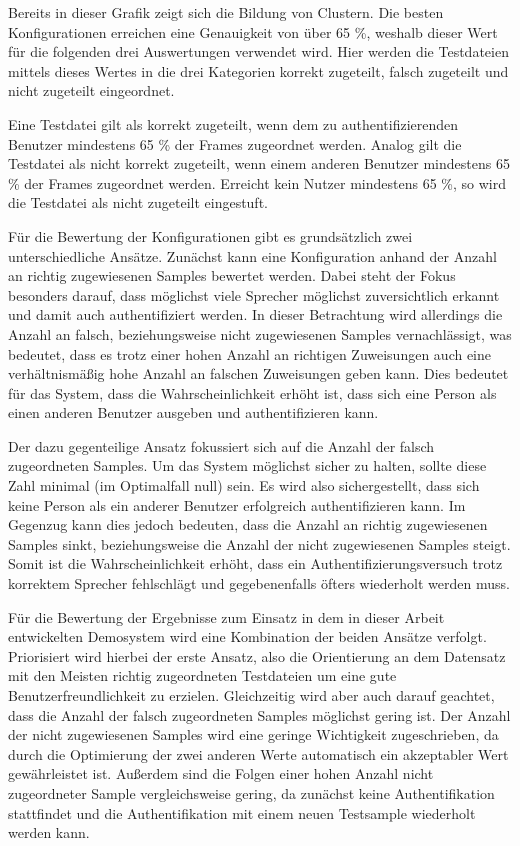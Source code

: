 Bereits in dieser Grafik zeigt sich die Bildung von Clustern.
Die besten Konfigurationen erreichen eine Genauigkeit von über 65 \%, weshalb dieser Wert für die folgenden drei Auswertungen verwendet wird.
Hier werden die Testdateien mittels dieses Wertes in die drei Kategorien korrekt zugeteilt, falsch zugeteilt und nicht zugeteilt eingeordnet.

Eine Testdatei gilt als korrekt zugeteilt, wenn dem zu authentifizierenden Benutzer mindestens 65 \% der Frames zugeordnet werden.
Analog gilt die Testdatei als nicht korrekt zugeteilt, wenn einem anderen Benutzer mindestens 65 \% der Frames zugeordnet werden.
Erreicht kein Nutzer mindestens 65 \%, so wird die Testdatei als nicht zugeteilt eingestuft.

Für die Bewertung der Konfigurationen gibt es grundsätzlich zwei unterschiedliche Ansätze.
Zunächst kann eine Konfiguration anhand der Anzahl an richtig zugewiesenen Samples bewertet werden.
Dabei steht der Fokus besonders darauf, dass möglichst viele Sprecher möglichst zuversichtlich erkannt und damit auch authentifiziert werden.
In dieser Betrachtung wird allerdings die Anzahl an falsch, beziehungsweise nicht zugewiesenen Samples vernachlässigt, was bedeutet, dass es trotz einer hohen Anzahl an richtigen Zuweisungen auch eine verhältnismäßig hohe Anzahl an falschen Zuweisungen geben kann.
Dies bedeutet für das System, dass die Wahrscheinlichkeit erhöht ist, dass sich eine Person als einen anderen Benutzer ausgeben und authentifizieren kann.

Der dazu gegenteilige Ansatz fokussiert sich auf die Anzahl der falsch zugeordneten Samples.
Um das System möglichst sicher zu halten, sollte diese Zahl minimal (im Optimalfall null) sein.
Es wird also sichergestellt, dass sich keine Person als ein anderer Benutzer erfolgreich authentifizieren kann.
Im Gegenzug kann dies jedoch bedeuten, dass die Anzahl an richtig zugewiesenen Samples sinkt, beziehungsweise die Anzahl der nicht zugewiesenen Samples steigt.
Somit ist die Wahrscheinlichkeit erhöht, dass ein Authentifizierungsversuch trotz korrektem Sprecher fehlschlägt und gegebenenfalls öfters wiederholt werden muss.

Für die Bewertung der Ergebnisse zum Einsatz in dem in dieser Arbeit entwickelten Demosystem wird eine Kombination der beiden Ansätze verfolgt.
Priorisiert wird hierbei der erste Ansatz, also die Orientierung an dem Datensatz mit den Meisten richtig zugeordneten Testdateien um eine gute Benutzerfreundlichkeit zu erzielen.
Gleichzeitig wird aber auch darauf geachtet, dass die Anzahl der falsch zugeordneten Samples möglichst gering ist.
Der Anzahl der nicht zugewiesenen Samples wird eine geringe Wichtigkeit zugeschrieben, da durch die Optimierung der zwei anderen Werte automatisch ein akzeptabler Wert gewährleistet ist.
Außerdem sind die Folgen einer hohen Anzahl nicht zugeordneter Sample vergleichsweise gering, da zunächst keine Authentifikation stattfindet und die Authentifikation mit einem neuen Testsample wiederholt werden kann.

